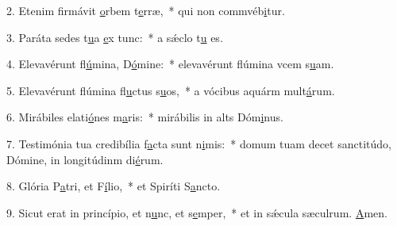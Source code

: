 2. Etenim firmávit \uline{o}rbem t\uline{e}rræ,~* qui non commvéb\uline{i}tur.\par 
3. Paráta sedes t\uline{u}a \uline{e}x tunc:~* a sǽclo t\uline{u} es.\par 
4. Elevavérunt fl\uline{ú}mina, D\uline{ó}mine:~* elevavérunt flúmina vcem s\uline{u}am.\par 
5. Elevavérunt flúmina fl\uline{u}ctus s\uline{u}os,~* a vócibus aquárm mult\uline{á}rum.\par 
6. Mirábiles elati\uline{ó}nes m\uline{a}ris:~* mirábilis in alts Dóm\uline{i}nus.\par 
7. Testimónia tua credibília f\uline{a}cta sunt n\uline{i}mis:~* domum tuam decet sanctitúdo, Dómine, in longitúdinm di\uline{é}rum.\par 
8. Glória P\uline{a}tri, et F\uline{í}lio,~* et Spiríti S\uline{a}ncto.\par 
9. Sicut erat in princípio, et n\uline{u}nc, et s\uline{e}mper,~* et in sǽcula sæculrum. \uline{A}men.\par 
